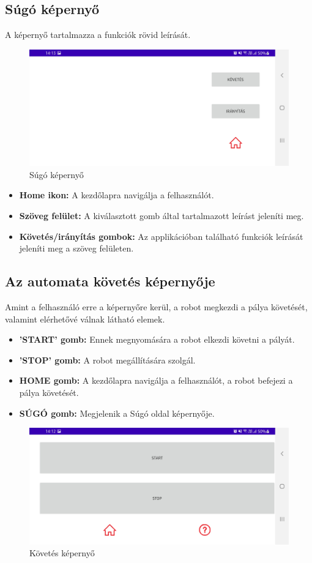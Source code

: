\documentclass[]{thesis-ekf}
\theoremstyle{definition}
\begin{document}
\subsection{Súgó képernyő}\label{help}
A képernyő tartalmazza a funkciók rövid leírását.
\begin{figure}[h]
	\centering
	\includegraphics[width=\columnwidth]{images/app_screen/help_screen}
	\caption{Súgó képernyő}
	\label{help-screen}
\end{figure}
\begin{itemize}
	\item \textbf{Home ikon:} A kezdőlapra navigálja a felhasználót.
	\item \textbf{Szöveg felület:} A kiválasztott gomb által tartalmazott leírást jeleníti meg.
	\item \textbf{Követés/irányítás gombok:} Az applikációban található funkciók leírását jeleníti meg a szöveg felületen.
\end{itemize}
\subsection{Az automata követés képernyője}\label{auto-follow}
Amint a felhasználó erre a képernyőre kerül, a robot megkezdi a pálya követését, valamint elérhetővé válnak  látható elemek.
\begin{itemize}
	\item \textbf{’START’ gomb:} Ennek megnyomására a robot elkezdi követni a pályát.
	\item \textbf{'STOP' gomb:} A robot megállítására szolgál.
	\item \textbf{HOME gomb:} A kezdőlapra navigálja a felhasználót, a robot befejezi a pálya követését.
	\item \textbf{SÚGÓ gomb:} Megjelenik a Súgó oldal képernyője.
\end{itemize}
\begin{figure}[h]
\centering
\includegraphics[width=\columnwidth]{images/app_screen/follow_screen}
\caption{Követés képernyő}
\label{follow-screen}
\end{figure}
\end{document}
